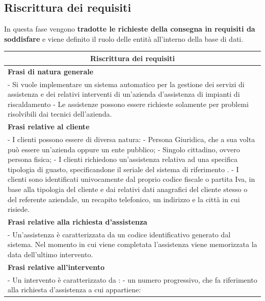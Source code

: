 \documentclass[legalpaper]{article}
\begin{document}
\subsection{Riscrittura dei requisiti}
In questa fase vengono \textbf{tradotte le richieste della consegna in requisiti da soddisfare} e viene definito il ruolo delle entità all'interno della base di dati.\\
\newline
\renewcommand\arraystretch{1,5}
\begin{tabular}{ |p{16 cm}| }
\hline
\multicolumn{1}{|c|}{\textbf{Riscrittura dei requisiti}} \\
\hline
\textbf{Frasi di natura generale}  \\
\hline
- Si vuole implementare un sistema automatico per la gestione dei servizi di assistenza e dei relativi interventi di un'azienda d'assistenza di impianti di riscaldamento \newline
- Le assistenze possono essere richieste solamente per problemi risolvibili dai tecnici dell'azienda.\\ \hline
\textbf{Frasi relative al cliente}  \\
\hline
-  I clienti possono essere di diversa natura:\newline
- Persona Giuridica, che a sua volta può essere un'azienda oppure un ente pubblico; \newline
- Singolo cittadino, ovvero persona fisica; \newline
- I clienti richiedono un'assistenza relativa ad una specifica tipologia di guasto, specificandone il seriale del sistema di riferimento .\newline
- I clienti sono identificati univocamente dal proprio codice fiscale o partita Iva, in base alla tipologia del cliente e dai relativi dati anagrafici del cliente stesso o del referente aziendale, un recapito telefonico, un indirizzo e la città in cui risiede.\\
\hline
\textbf{Frasi relative alla richiesta d'assistenza}  \\
\hline
- Un'assistenza è caratterizzata da un codice identificativo generato dal sistema. Nel momento in cui viene completata l'assistenza viene memorizzata la data dell'ultimo intervento.\\
\hline
\textbf{Frasi relative all'intervento}  \\
\hline
- Un intervento è caratterizzato da :\newline 
- un numero progressivo, che fa riferimento alla richiesta d'assistenza a cui appartiene: \newline

\end{tabular}
\end{document}
